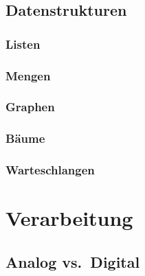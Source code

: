 \documentclass[
  letterpaper,
  DIV=11]{scrreprt}
\begin{document}
\chapter{Datenstrukturen}\label{datenstrukturen}

\section{Listen}\label{listen}

\section{Mengen}\label{mengen}

\section{Graphen}\label{graphen}

\section{Bäume}\label{buxe4ume}

\section{Warteschlangen}\label{warteschlangen}

\part{Verarbeitung}

\chapter{Analog vs.~Digital}\label{analog-vs.-digital}
\end{document}
